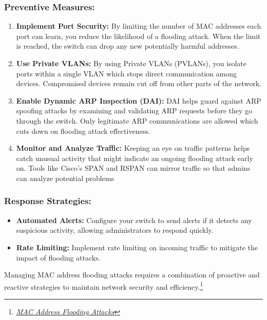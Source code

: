 \documentclass[11pt,a4paper]{article}
\begin{document}
\subsubsection*{Preventive Measures:}
    \begin{enumerate}
        \item \textbf{Implement Port Security:} By limiting the number of MAC addresses each port can learn, you reduce the likelihood of a flooding attack. When the limit is reached, the switch can drop any new potentially harmful addresses.
        \item \textbf{Use Private VLANs:} By using Private VLANs (PVLANs), you isolate ports within a single VLAN which stops direct communication among devices. Compromised devices remain cut off from other parts of the network.
        \item \textbf{Enable Dynamic ARP Inspection (DAI):} DAI helps guard against ARP spoofing attacks by examining and validating ARP requests before they go through the switch. Only legitimate ARP communications are allowed which cuts down on flooding attack effectiveness.
        \item \textbf{Monitor and Analyze Traffic:} Keeping an eye on traffic patterns helps catch unusual activity that might indicate an ongoing flooding attack early on. Tools like Cisco's SPAN and RSPAN can mirror traffic so that admins can analyze potential problems 
    \end{enumerate}

    \subsubsection*{Response Strategies:}

    \begin{itemize}
        \item \textbf{Automated Alerts:} Configure your switch to send alerts if it detects any suspicious activity, allowing administrators to respond quickly.
        \item \textbf{Rate Limiting:} Implement rate limiting on incoming traffic to mitigate the impact of flooding attacks.
    \end{itemize}
    
    Managing MAC address flooding attacks requires a combination of proactive and reactive strategies to maintain network security and efficiency.\footnote{\href{https://www.interserver.net/tips/kb/mac-flooding-prevent/}{\textit{MAC Address Flooding Attacks}}}
    
\end{document}
